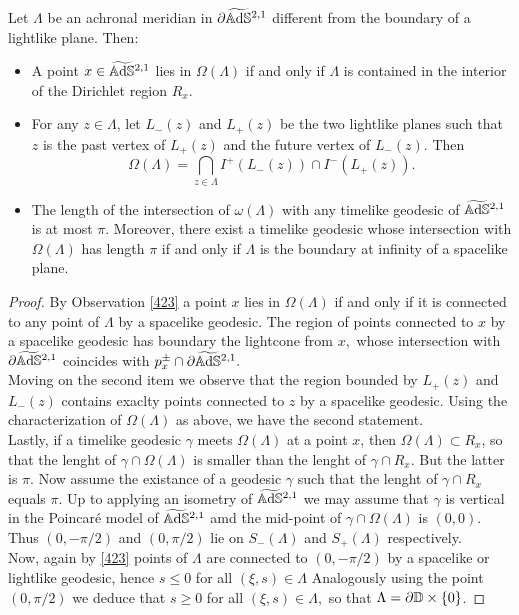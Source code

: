 \begin{proposition}\label{432}
    Let $\Lambda$ be an achronal meridian in $\partial\widetilde{\mathbb{A}\mathrm{d}\mathbb{S}}{}^{2,1}$ different from the boundary of a lightlike plane. Then: 
        \begin{itemize}
            \item A point $x\in\widetilde{\mathbb{A}\mathrm{d}\mathbb{S}}{}^{2,1}$ lies in $\Omega(\Lambda)$ if and only if $\Lambda$ is contained in the interior of the Dirichlet region $R_x$. 
            \item For any $z\in\Lambda$, let $L_-(z)$ and $L_+(z)$ be the two lightlike planes such that $z$ is the past vertex of $L_+(z)$ and the future vertex of $L_-(z)$. Then 
            \[
                \Omega(\Lambda)=\bigcap_{z\in\Lambda}I^+(L_-(z))\cap I^{-}(L_+(z)).
            \] 
            \item The length of the intersection of $\omega(\Lambda)$ with any timelike geodesic of $\widetilde{\mathbb{A}\mathrm{d}\mathbb{S}}{}^{2,1}$ is at most $\pi.$ Moreover, there exist a timelike geodesic whose intersection with $\Omega(\Lambda)$ has length $\pi$ if and only if $\Lambda$ is the boundary at infinity of a spacelike plane. 
        \end{itemize}
\end{proposition}
\begin{proof}
    By Observation \ref{423} a point $x$ lies in $\Omega(\Lambda)$ if and only if it is connected to any point of $\Lambda$ by a spacelike geodesic. The region of points connected to $x$ by a spacelike geodesic has boundary the lightcone from $x,$ whose intersection with $\partial\widetilde{\mathbb{A}\mathrm{d}\mathbb{S}}{}^{2,1}$ coincides with $p_x^\pm\cap \partial\widetilde{\mathbb{A}\mathrm{d}\mathbb{S}}{}^{2,1}.$\\
    Moving on the second item we observe that the region bounded by $L_+(z)$ and $L_-(z)$ contains exaclty points connected to $z$ by a spacelike geodesic. Using the characterization of $\Omega(\Lambda)$ as above, we have the second statement.   \\
    Lastly, if a timelike geodesic $\gamma$ meets $\Omega(\Lambda)$ at a point $x$, then $\Omega(\Lambda)\subset R_x$, so that the lenght of $\gamma\cap\Omega(\Lambda)$ is smaller than the lenght of $\gamma\cap R_x$. But the latter is $\pi.$ Now assume the existance of a geodesic $\gamma$ such that the lenght of $\gamma\cap R_x$ equals $\pi.$ Up to applying an isometry of $\widetilde{\mathbb{A}\mathrm{d}\mathbb{S}}{}^{2,1}$ we may assume that $\gamma$ is vertical in the Poincaré model of $\widetilde{\mathbb{A}\mathrm{d}\mathbb{S}}{}^{2,1}$ amd the mid-point of $\gamma\cap\Omega(\Lambda)$ is $(0,0)$. Thus $(0,-\pi/2)$ and $(0,\pi/2)$ lie on $S_-(\Lambda)$ and $S_+(\Lambda)$ respectively. \\
    Now, again by \ref{423} points of $\Lambda$ are connected to $(0,-\pi/2)$ by a spacelike or lightlike geodesic, hence $s\leq 0$ for all $(\xi,s)\in\Lambda$ Analogously using the point $(0,\pi/2)$ we deduce that $s\geq 0$ for all $(\xi,s)\in\Lambda,$ so that $\Lambda=\partial\mathbb{D}\times\{0\}$.
\end{proof}

